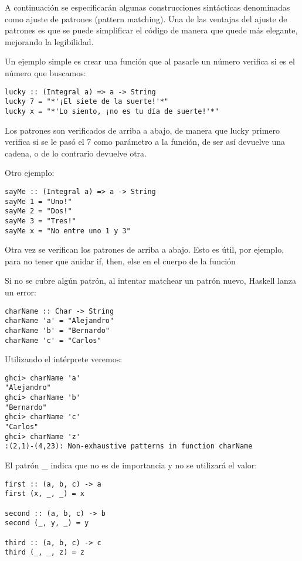 A continuación se especificarán algunas construcciones sintácticas denominadas como ajuste de patrones (pattern matching).
Una de las ventajas del ajuste de patrones es que se puede simplificar el código de manera que quede más elegante, mejorando la legibilidad.

Un ejemplo simple es crear una función que al pasarle un número verifica si es el número que buscamos:

\begin{lstlisting}
lucky :: (Integral a) => a -> String
lucky 7 = "*'¡El siete de la suerte!'*"
lucky x = "*'Lo siento, ¡no es tu día de suerte!'*"
\end{lstlisting}

Los patrones son verificados de arriba a abajo, de manera que lucky primero verifica si se le pasó el 7 como parámetro a la función, de ser así devuelve una cadena, o de lo contrario devuelve otra.

Otro ejemplo:

\begin{lstlisting}
sayMe :: (Integral a) => a -> String
sayMe 1 = "Uno!"
sayMe 2 = "Dos!"
sayMe 3 = "Tres!"
sayMe x = "No entre uno 1 y 3"
\end{lstlisting}

Otra vez se verifican los patrones de arriba a abajo. Esto es útil, por ejemplo, para no tener que anidar if, then, else en el cuerpo de la función

Si no se cubre algún patrón, al intentar matchear un patrón nuevo, Haskell lanza un error:

\begin{lstlisting}
charName :: Char -> String
charName 'a' = "Alejandro"
charName 'b' = "Bernardo"
charName 'c' = "Carlos"
\end{lstlisting}

Utilizando el intérprete veremos:

\begin{lstlisting}
ghci> charName 'a'
"Alejandro"
ghci> charName 'b'
"Bernardo"
ghci> charName 'c'
"Carlos"
ghci> charName 'z'
:(2,1)-(4,23): Non-exhaustive patterns in function charName
\end{lstlisting}

El patrón \_ indica que no es de importancia y no se utilizará el valor:

\begin{lstlisting}
first :: (a, b, c) -> a
first (x, _, _) = x

second :: (a, b, c) -> b
second (_, y, _) = y

third :: (a, b, c) -> c
third (_, _, z) = z
\end{lstlisting}

